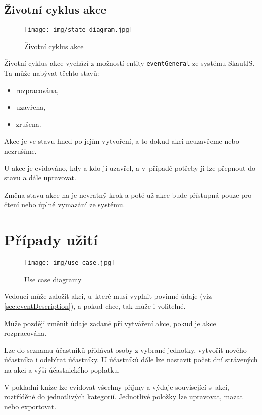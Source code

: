 \documentclass[thesis=B,czech]{FITthesis}[2012/04/27]
\begin{document}
\subsection{Životní cyklus akce}
 \begin{figure}[h] \centering
 	\texttt{[image: img/state-diagram.jpg]}
 	\caption[Životní cyklus akce]{Životní cyklus akce}\label{fig:state-diagram}
 \end{figure}
 Životní cyklus akce vychází z možností entity \texttt{eventGeneral} ze systému SkautIS. Ta může nabývat těchto stavů:
 
 \begin{itemize}
 	\item rozpracována,
	\item uzavřena,
	\item zrušena.
 \end{itemize} 
 
Akce je ve stavu  hned po jejím vytvoření, a to dokud akci neuzavřeme nebo nezrušíme.

U  akce je evidováno, kdy a kdo ji uzavřel, a v~případě potřeby ji lze přepnout do stavu  a dále upravovat.

Změna stavu akce na  je nevratný krok a poté už akce bude přístupná pouze pro čtení nebo úplné vymazání ze systému.

\section{Případy užití}
\begin{figure}[h]\centering
 	\texttt{[image: img/use-case.jpg]}
 	\caption[Případy užití]{Use case diagramy}\label{fig:use-case}
\end{figure}
Vedoucí může založit akci, u~které musí vyplnit povinné údaje (viz \ref{sec:eventDescription}), a pokud chce, tak může i volitelné.

Může později změnit údaje zadané při vytváření akce, pokud je akce rozpracována. 

Lze do seznamu účastníků přidávat osoby z vybrané jednotky, vytvořit nového účastníka i odebírat účastníky. U účastníků dále lze nastavit počet dní strávených na akci a výši účastnického poplatku. 

V pokladní knize lze evidovat všechny příjmy a výdaje související s~akcí, roztříděné do jednotlivých kategorií. Jednotlivé položky lze upravovat, mazat nebo exportovat.
\end{document}
